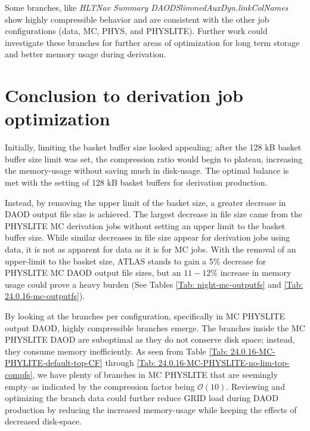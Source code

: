 



Some branches, like \textit{HLTNav Summary DAODSlimmedAuxDyn.linkColNames} show highly compressible behavior and are consistent with the other job configurations (data, MC, PHYS, and PHYSLITE). 
Further work could investigate these branches for further areas of optimization for long term storage and better memory usage during derivation.

\section{Conclusion to derivation job optimization}
\label{sec:DAODProd_Results_conclusion}

Initially, limiting the basket buffer size looked appealing; after the 128 kB basket buffer size limit was set, the compression ratio would begin to plateau, increasing the memory-usage without saving much in disk-usage. 
The optimal balance is met with the setting of 128 kB basket buffers for derivation production. 

Instead, by removing the upper limit of the basket size, a greater decrease in DAOD output file size is achieved. 
The largest decrease in file size came from the PHYSLITE MC derivation jobs without setting an upper limit to the basket buffer size. 
While similar decreases in file size appear for derivation jobs using data, it is not as apparent for data as it is for MC jobs. 
With the removal of an upper-limit to the basket size, ATLAS stands to gain a 5\% decrease for PHYSLITE MC DAOD output file sizes, but an $11 - 12$\% increase in memory usage could prove a heavy burden (See Tables \ref{Tab: night-mc-outputfs} and \ref{Tab: 24.0.16-mc-outputfs}).

By looking at the branches per configuration, specifically in MC PHYSLITE output DAOD, highly compressible branches emerge. 
The branches inside the MC PHYSLITE DAOD are suboptimal as they do not conserve disk space; instead, they consume memory inefficiently. 
As seen from Table \ref{Tab: 24.0.16-MC-PHYLITE-default-top-CF} through \ref{Tab: 24.0.16-MC-PHYSLITE-no-lim-top-compfs}, we have plenty of branches in MC PHYSLITE that are seemingly empty--as indicated by the compression factor being $\mathcal{O}(10)$. 
Reviewing and optimizing the branch data could further reduce GRID load during DAOD production by reducing the increased memory-usage while keeping the effects of decreased disk-space. 
